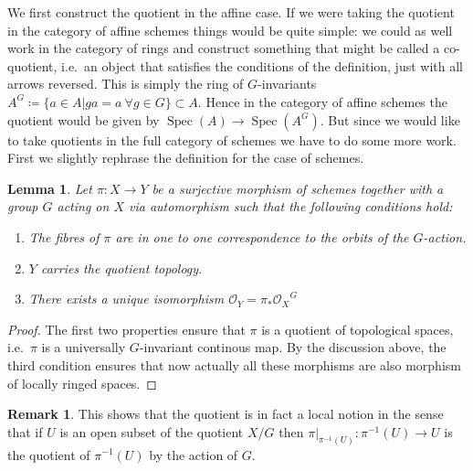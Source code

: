 \documentclass[11pt, a4paper, german, twoside]{article}
\theoremstyle{plain}
\newtheorem{lemma}[theorem]{Lemma}
\theoremstyle{definition}
\newtheorem{remark}[theorem]{Remark}
\DeclareMathOperator{\Spec}{Spec}
\begin{document}
We first construct the quotient in the affine case. If we were taking the quotient in the category of affine schemes things would be
quite simple: we could as well work in the category of rings and construct something that might be called a co-quotient, i.e.\ an object that
satisfies the conditions of the definition, just with all arrows reversed. This is simply the ring of $G$-invariants
$A^G \coloneqq \{a \in A | ga = a \ \forall g \in G\} \subset A$. Hence in the category of affine schemes the quotient would be given by 
$\Spec(A) \to \Spec(A^G)$. But since we would like to take quotients in the full category of schemes we have to do some more work.
First we slightly rephrase the definition for the case of schemes.
\begin{lemma}
    \label{quotProps}
    Let $\pi \colon X \to Y$ be a surjective morphism of schemes together with a group $G$ acting on $X$ via automorphism 
    such that the following conditions hold:
    \begin{enumerate}[label=\rm{\roman*)}]
        \item The fibres of $\pi$ are in one to one correspondence to the orbits of the $G$-action.
        \item $Y$ carries the quotient topology.
        \item There exists a unique isomorphism $\mathcal{O}_Y = {\pi_*\mathcal{O}_X}^G$
    \end{enumerate}
\end{lemma}
\begin{proof}
    The first two properties ensure that $\pi$ is a quotient of topological spaces, i.e.\ $\pi$ is a universally $G$-invariant continous map.
    By the discussion above, the third condition ensures that now actually all these morphisms are also morphism of locally ringed spaces.
\end{proof}

\begin{remark}
    \label{quotLocal}
    This shows that the quotient is in fact a local notion in the sense that if $U$ is an open subset of the quotient $X/G$ 
    then $\pi|_{\pi^{-1}(U)} \colon \pi^{-1}(U) \to U$ is the quotient of $\pi^{-1}(U)$ by the action of $G$.
\end{remark}
\end{document}

